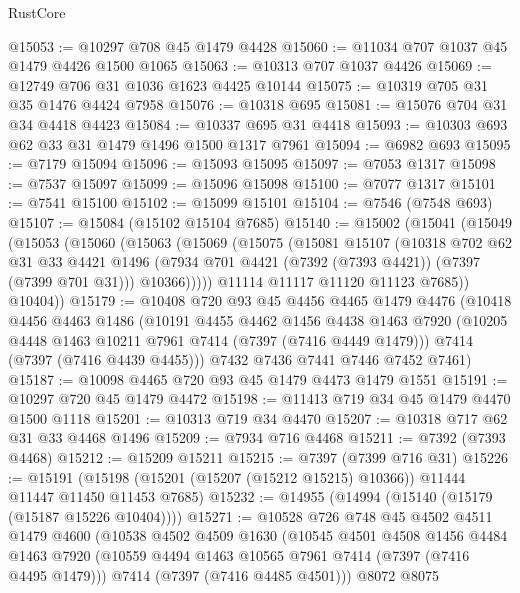 \begin{lexlean}{RustCore}
\begin{coremodule}
@15053 := @10297 @708 @45 @1479 @4428
@15060 := @11034 @707 @1037 @45 @1479 @4426 @1500 @1065
@15063 := @10313 @707 @1037 @4426
@15069 := @12749 @706 @31 @1036 @1623 @4425 @10144
@15075 := @10319 @705 @31 @35 @1476 @4424 @7958
@15076 := @10318 @695
@15081 := @15076 @704 @31 @34 @4418 @4423
@15084 := @10337 @695 @31 @4418
@15093 := @10303 @693 @62 @33 @31 @1479 @1496 @1500 @1317 @7961
@15094 := @6982 @693
@15095 := @7179 @15094
@15096 := @15093 @15095
@15097 := @7053 @1317
@15098 := @7537 @15097
@15099 := @15096 @15098
@15100 := @7077 @1317
@15101 := @7541 @15100
@15102 := @15099 @15101
@15104 := @7546 (@7548 @693)
@15107 := @15084 (@15102 @15104 @7685)
@15140 := @15002
    (@15041
      (@15049
        (@15053
          (@15060
            (@15063
              (@15069
                (@15075
                  (@15081
                    @15107
                    (@10318
                      @702
                      @62
                      @31
                      @33
                      @4421
                      @1496
                      (@7934 @701 @4421 (@7392 (@7393 @4421)) (@7397 (@7399 @701 @31)))
                      @10366)))))
            @11114
            @11117
            @11120
            @11123
            @7685))
        @10404))
@15179 := @10408
    @720
    @93
    @45
    @4456
    @4465
    @1479
    @4476
    (@10418
      @4456
      @4463
      @1486
      (@10191
        @4455
        @4462
        @1456
        @4438
        @1463
        @7920
        (@10205 @4448 @1463 @10211 @7961 @7414 (@7397 (@7416 @4449 @1479)))
        @7414
        (@7397 (@7416 @4439 @4455)))
      @7432
      @7436
      @7441
      @7446
      @7452
      @7461)
@15187 := @10098 @4465 @720 @93 @45 @1479 @4473 @1479 @1551
@15191 := @10297 @720 @45 @1479 @4472
@15198 := @11413 @719 @34 @45 @1479 @4470 @1500 @1118
@15201 := @10313 @719 @34 @4470
@15207 := @10318 @717 @62 @31 @33 @4468 @1496
@15209 := @7934 @716 @4468
@15211 := @7392 (@7393 @4468)
@15212 := @15209 @15211
@15215 := @7397 (@7399 @716 @31)
@15226 := @15191 (@15198 (@15201 (@15207 (@15212 @15215) @10366)) @11444 @11447 @11450 @11453 @7685)
@15232 := @14955 (@14994 (@15140 (@15179 (@15187 @15226 @10404))))
@15271 := @10528
    @726
    @748
    @45
    @4502
    @4511
    @1479
    @4600
    (@10538
      @4502
      @4509
      @1630
      (@10545
        @4501
        @4508
        @1456
        @4484
        @1463
        @7920
        (@10559 @4494 @1463 @10565 @7961 @7414 (@7397 (@7416 @4495 @1479)))
        @7414
        (@7397 (@7416 @4485 @4501)))
      @8072
      @8075

\end{coremodule}
\end{lexlean}

